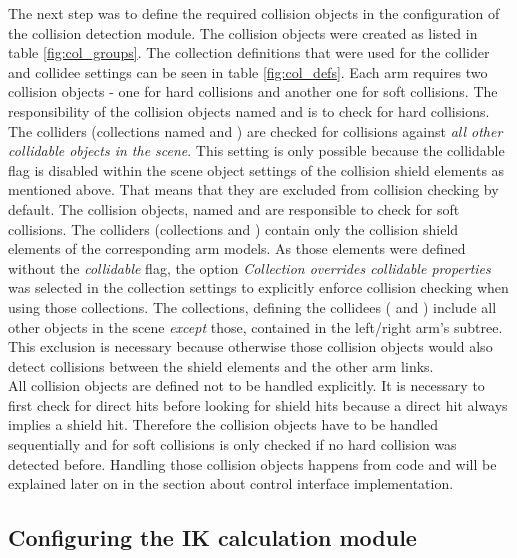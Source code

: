 The next step was to define the required collision objects in the configuration of the collision detection module. The collision objects were created as listed in table \ref{fig:col_groups}. The collection definitions that were used for the collider and collidee settings can be seen in table \ref{fig:col_defs}.
Each arm requires two collision objects - one for hard collisions and another one for soft collisions. The responsibility of the collision objects named  and  is to check for hard collisions. The colliders (collections named  and ) are checked for collisions against \emph{all other collidable objects in the scene}. This setting is only possible because the collidable flag is disabled within the scene object settings of the collision shield elements as mentioned above. That means that they are excluded from collision checking by default. The collision objects, named  and  are responsible to check for soft collisions. The colliders (collections  and ) contain only the collision shield elements of the corresponding arm models. As those elements were defined without the \emph{collidable} flag, the option \emph{Collection overrides collidable properties} was selected in the collection settings to explicitly enforce collision checking when using those collections. The collections, defining the collidees ( and ) include all other objects in the scene \emph{except} those, contained in the left/right arm's subtree. This exclusion is necessary because otherwise those collision objects would also detect collisions between the shield elements and the other arm links.\\

All collision objects are defined not to be handled explicitly. It is necessary to first check for direct hits before looking for shield hits because a direct hit always implies a shield hit. Therefore the collision objects have to be handled sequentially and for soft collisions is only checked if no hard collision was detected before. Handling those collision objects happens from code and will be explained later on in the section about control interface implementation.

\subsection{Configuring the IK calculation module}
\label{sec:config_ik}

